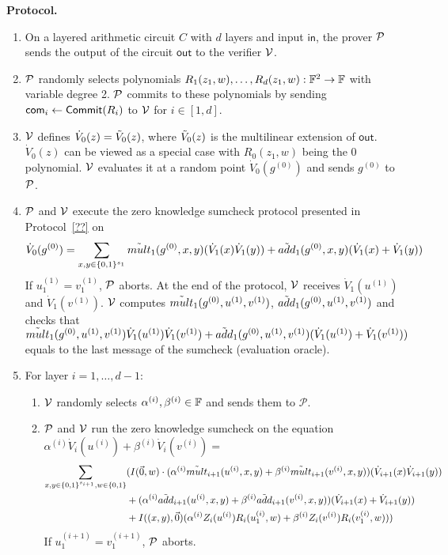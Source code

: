 \medskip\noindent\textbf{Protocol.}
\begin{enumerate} 
\item On a layered arithmetic circuit $C$ with $d$ layers and input $\mathsf{in}$, the prover $\P$ sends the output of the circuit $\mathsf{out}$ to the verifier $\V$.

\item $\P$ randomly selects polynomials $R_1(z_1, w), \ldots, R_d(z_1, w): \F^2\rightarrow \F$ with variable degree 2. $\P$ commits to these polynomials by sending $\comm_i\leftarrow\Commit(R_i)$ to $\V$ for $i\in[1,d]$.

\item $\V$ defines $\dot{V}_0(z)= \tV_0(z)$, where $\tV_0(z)$ is the multilinear extension of $\mathsf{out}$. $\dot{V}_0(z)$ can be viewed as a special case with $R_0(z_1,w)$ being the 0 polynomial. $\V$ evaluates it at a random point $\dot{V}_0(g^{(0)})$ and sends $g^{(0)}$ to $\P$.
 
\item $\P$ and $\V$ execute the zero knowledge sumcheck protocol presented in Protocol~\ref{??} on
\[
\dot{V}_{0}(g^{(0)})=\sum_{x, y\in \binary^{s_{1}}}\tilde{mult}_{1}(g^{(0)}, x, y)(\dot{V}_{1}(x)\dot{V}_{1}(y))+\tilde{add}_{1}(g^{(0)},x,y)(\dot{V}_{1}(x)+\dot{V}_{1}(y))
\]
If $u_1^{(1)} = v_1^{(1)}$, $\P$ aborts. At the end of the protocol, $\V$ receives $\dot{V}_1(u^{(1)})$ and $\dot{V}_1(v^{(1)})$. $\V$ computes $\tmult_1(g^{(0)},u^{(1)},v^{(1)})$, $\tadd_1(g^{(0)},u^{(1)},v^{(1)})$ and checks that $\tmult_1(g^{(0)},u^{(1)},v^{(1)})\dot{V}_1(u^{(1)})\dot{V}_1(v^{(1)})+\tadd_1(g^{(0)},u^{(1)},v^{(1)})(\dot{V}_1(u^{(1)})+\dot{V}_1(v^{(1)}))$ equals to the last message of the sumcheck (evaluation oracle).

\item For layer $i=1,\ldots, d-1$:
	\begin{enumerate}
	\item $\V$ randomly selects $\alpha^{(i)}, \beta^{(i)}\in\F$ and sends them to $\mathcal{P}$.
	\item $\P$ and $\V$ run the zero knowledge sumcheck on the equation\\

	$\alpha^{(i)}\dot{V}_i(u^{(i)})+\beta^{(i)}\dot{V}_i(v^{(i)})=$
	\begin{align*}
	\sum_{x, y\in \binary^{s_{i+1}},w \in \binary}&(I(\vec{0},w) \cdot (\alpha^{(i)}\tilde{mult}_{i+1}(u^{(i)}, x, y)+\beta^{(i)}\tilde{mult}_{i+1}(v^{(i)}, x, y))(\dot{V}_{i+1}(x)\dot{V}_{i+1}(y))\\
	&+(\alpha^{(i)}\tilde{add}_{i+1}(u^{(i)}, x, y)+\beta^{(i)}\tilde{add}_{i+1}(v^{(i)}, x, y))(\dot{V}_{i+1}(x)+\dot{V}_{i+1}(y))\nonumber\\
	&+ I((x, y), \vec{0})(\alpha^{(i)}Z_i(u^{(i)})R_i(u_1^{(i)}, w)+\beta^{(i)}Z_i(v^{(i)})R_i(v_1^{(i)}, w)))
	\end{align*}
	If $u_1^{(i+1)} = v_1^{(i+1)}$, $\P$ aborts.
	

\end{enumerate}
\end{enumerate}
